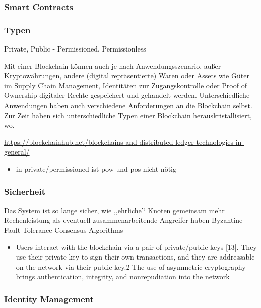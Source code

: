     
    \begin{figure}[H]
    \end{figure}
    
    \subsubsection{Smart Contracts}
    
    \subsubsection{Typen}
        Private, Public - Permissioned, Permissionless
        
        Mit einer Blockchain können auch je nach Anwendungsszenario, außer Kryptowährungen, andere (digital repräsentierte) Waren oder Assets wie Güter im Supply Chain Management\cite{Underwood2016}, Identitäten zur Zugangskontrolle\cite{Kshetri2017} oder Proof of Ownership digitaler Rechte\cite{Wuest2017} gespeichert und gehandelt werden. 
        Unterschiedliche Anwendungen haben auch verschiedene Anforderungen an die Blockchain selbst. 
        Zur Zeit haben sich unterschiedliche Typen einer Blockchain herauskristallisiert, wo.
        
        
        {\sloppy\url{https://blockchainhub.net/blockchains-and-distributed-ledger-technologies-in-general/}}
        \begin{itemize}[noitemsep]
            \item in private/\-permissioned ist \gls{pow} und \gls{pos} nicht nötig
        \end{itemize}
    
    \subsubsection{Sicherheit}
    \label{sec:sota_blockchain_security}
        Das System ist so lange sicher, wie ,,ehrliche'` Knoten gemeinsam mehr Rechenleistung als eventuell zusammenarbeitende Angreifer haben\cite{Nakamoto2008}
        Byzantine Fault Tolerance
        Consensus Algorithms
        \begin{itemize}
            \item Users interact with the blockchain via a pair of private/public keys [13]. They use their private key to sign their own transactions, and they are addressable on the network via their public key.2 The use of asymmetric cryptography brings authentication, integrity, and nonrepudiation into the network\cite{Christidis2016}
        \end{itemize}
    
    \subsubsection{Identity Management}
    \label{sec:sota_blockchain_identitymgmnt}
